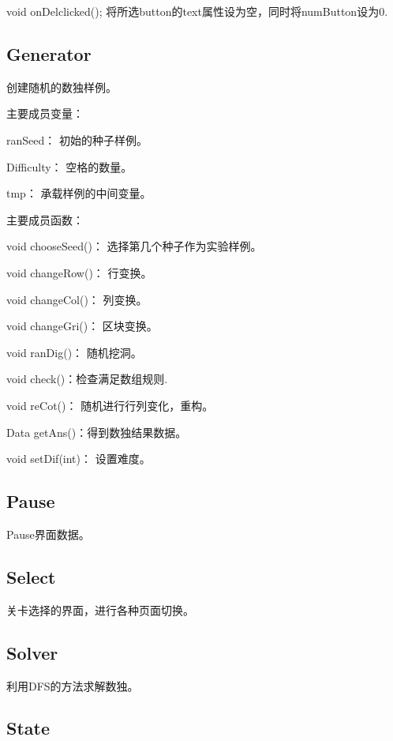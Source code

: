 \documentclass[hyperref,UTF8]{ctexart}
\begin{document}
    void onDelclicked();               将所选button的text属性设为空，同时将numButton设为0.





\subsection{Generator}
    创建随机的数独样例。

    主要成员变量：

    ranSeed： 初始的种子样例。

    Difficulty： 空格的数量。

    tmp： 承载样例的中间变量。

    主要成员函数：

    void chooseSeed()： 选择第几个种子作为实验样例。

    void changeRow()： 行变换。

    void changeCol()： 列变换。

    void changeGri()： 区块变换。

    void ranDig()： 随机挖洞。

    void check()：检查满足数组规则.

    void reCot()： 随机进行行列变化，重构。

    Data getAns()：得到数独结果数据。

    void setDif(int)： 设置难度。





\subsection{Pause}
    Pause界面数据。



\subsection{Select}

    关卡选择的界面，进行各种页面切换。

\newpage

\subsection{Solver}

    利用DFS的方法求解数独。


\subsection{State}
\end{document}
